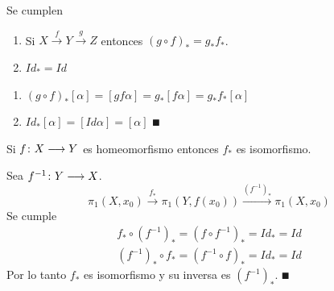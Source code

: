 \documentclass[GTS.tex]{subfiles}
\begin{document}
\begin{prop} Se cumplen
\begin{enumerate}
\item Si $X\overset{f}{\longrightarrow}Y\overset{g}{\longrightarrow}Z$ entonces $(g\circ f)_*=g_*f_*$.
\item $Id_*=Id$
\end{enumerate}
\end{prop}
\begin{dem}
\begin{enumerate}
\item $(g\circ f)_*[\alpha]=[gf\alpha]=g_*[f\alpha]=g_*f_*[\alpha]$
\item $Id_*[\alpha]=[Id\alpha]=[\alpha]$
$\QED$
\end{enumerate}
\end{dem}

\begin{consec} Si $f\colon{X}\longrightarrow{Y}$ es homeomorfismo entonces $f_*$ es isomorfismo.
\begin{dem}
Sea $f^{-1}\colon{Y}\longrightarrow{X}$.
\[
\pi_1(X,x_0)\overset{f_*}{\longrightarrow}\pi_1(Y,f(x_0))\overset{(f^{-1})_*}{\longrightarrow}\pi_1(X,x_0)
\]
Se cumple
\begin{gather*}
f_*\circ(f^{-1})_*=(f\circ f^{-1})_*=Id_*=Id\\
(f^{-1})_*\circ f_*=(f^{-1}\circ f)_*=Id_*=Id
\end{gather*}
Por lo tanto $f_*$ es isomorfismo y su inversa es $(f^{-1})_*$. $\QED$
\end{dem}
\end{consec}

\vspace{0.4cm}
\end{document}
